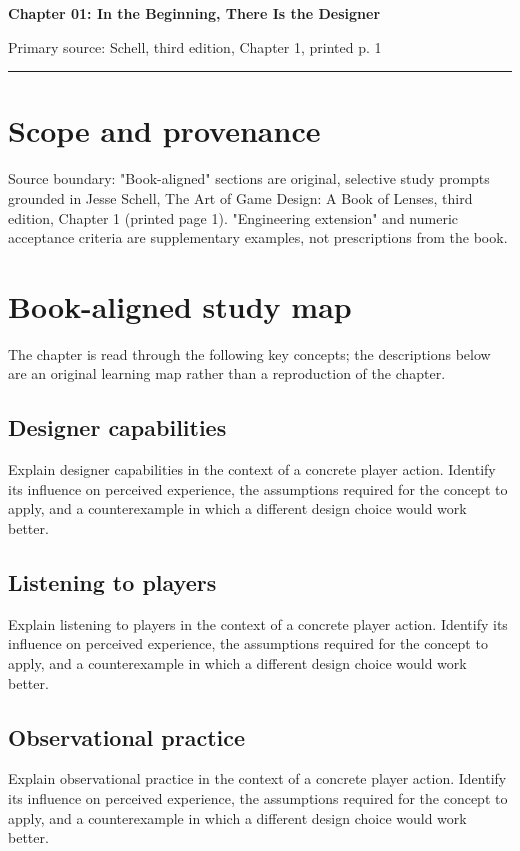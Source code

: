 \documentclass[11pt]{article}
\begin{document}
{\huge\bfseries\color{suiteblue} Chapter 01: In the Beginning, There Is the Designer}\par
\vspace{0.15in}
{\normalsize\color{suitegray} Primary source: Schell, third edition, Chapter 1, printed p. 1}\par
\vspace{0.15in}\hrule\vspace{0.15in}

\section{Scope and provenance}
Source boundary: "Book-aligned" sections are original, selective study prompts grounded in Jesse Schell, The Art of Game Design: A Book of Lenses, third edition, Chapter 1 (printed page 1). "Engineering extension" and numeric acceptance criteria are supplementary examples, not prescriptions from the book.


\section{Book-aligned study map}
The chapter is read through the following key concepts; the descriptions below are an original learning map rather than a reproduction of the chapter.


\subsection{Designer capabilities}
Explain designer capabilities in the context of a concrete player action. Identify its influence on perceived experience, the assumptions required for the concept to apply, and a counterexample in which a different design choice would work better.


\subsection{Listening to players}
Explain listening to players in the context of a concrete player action. Identify its influence on perceived experience, the assumptions required for the concept to apply, and a counterexample in which a different design choice would work better.


\subsection{Observational practice}
Explain observational practice in the context of a concrete player action. Identify its influence on perceived experience, the assumptions required for the concept to apply, and a counterexample in which a different design choice would work better.
\end{document}
